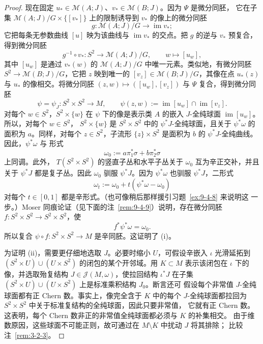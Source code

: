 \begin{proof}
现在固定 $u_*\in\mathcal M(A;J)$、$v_*\in\mathcal M(B;J)$。因为 $\Psi$ 是微分同胚，
它在子集
$\mathcal M(A;J)/G\times\{[v_*]\}$ 上的限制诱导到 $v_*$ 的像上的微分同胚
\[
  g:\mathcal M(A;J)/G\longrightarrow\operatorname{im}v_*;
\]
它把每条无参数曲线 $[u]$ 映为该曲线与 $\operatorname{im}v_*$ 的交点。把 $g$ 的逆与
$v_*$ 预复合，得到微分同胚
\[
  g^{-1}\circ v_*:S^2\longrightarrow\mathcal M(A;J)/G,
  \qquad
  w\longmapsto[u_w],
\]
其中 $[u_w]$ 是通过 $v_*(w)$ 的 $\mathcal M(A;J)/G$ 中唯一元素。类似地，有微分同胚
$S^2\to\mathcal M(B;J)/G$，它把 $z$ 映到唯一的
$[v_z]\in\mathcal M(B;J)/G$，其像在点 $u_*(z)$ 与 $u_*$ 的像相交。将微分同胚
$(z,w)\mapsto([u_w],[v_z])$ 与 $\Psi$ 复合，得到微分同胚
\begin{equation}\label{eq:9-4-4}
  \psi=\psi_J:S^2\times S^2\longrightarrow M,
  \qquad
  \psi(z,w):=\operatorname{im}[u_w]\cap\operatorname{im}[v_z].
\end{equation}
对每个 $w\in S^2$，$S^2\times\{w\}$ 在 $\psi$ 下的像是表示类 $A$ 的嵌入
$J$-全纯球面 $\operatorname{im}[u_w]$。所以，对每个 $w\in S^2$，
$S^2\times\{w\}$ 是 $S^2\times S^2$ 中的 $\psi^*J$-全纯球面，且关于
$\psi^*\omega$ 的面积为 $a$。同样，对每个 $z\in S^2$，子流形
$\{z\}\times S^2$ 是面积为 $b$ 的 $\psi^*J$-全纯曲线。因此，$\psi^*\omega$ 与
形式
\[
  \omega_0:=a\pi_1^*\sigma+b\pi_2^*\sigma
\]
上同调。此外，
$T(S^2\times S^2)$ 的竖直子丛和水平子丛关于 $\omega_0$ 互为辛正交补，并且关于
$\psi^*J$ 都是复子丛。因此 $\omega_0$ 驯服 $\psi^*J$。因为 $\psi^*\omega$ 也驯服
$\psi^*J$，二形式
\[
  \omega_t:=\omega_0+t(\psi^*\omega-\omega_0)
\]
对每个 $t\in[0,1]$ 都是辛形式。（也可像稍后那样援引习题~\ref{ex:9-4-8} 来说明这
一步。）Moser 同痕论证（见下面的注~\ref{rem:9-4-9}）说明，存在微分同胚
$f:S^2\times S^2\to S^2\times S^2$，使
\[
  f^*\psi^*\omega=\omega_0.
\]
所以复合 $\psi\circ f:S^2\times S^2\to M$ 是辛同胚。这证明了 (i)。

为证明 (ii)，需要更仔细地选取 $J$。必要时缩小 $U$，可假设辛嵌入 $\iota$ 光滑延拓到
$(S^2\times U)\cup(U\times S^2)$ 的闭包的某个开邻域。用 $K\subset M$ 表示该闭包在
$\iota$ 下的像，并选取殆复结构 $J\in\mathcal J(M,\omega)$，使拉回结构
$\iota^*J$ 在子集 $(S^2\times U)\cup(U\times S^2)$ 上是标准乘积结构 $J_0$。断言还可
假设每个非常值 $J$-全纯球面都有正 Chern 数。事实上，像完全含于 $K$ 中的每个
$J$-全纯球面都拉回为 $S^2\times S^2$ 中关于标准复结构的全纯球面，因此只要非常值，
它就有正 Chern 数。这表明，每个 Chern 数非正的非常值全纯球面都必须与 $K$ 的补集相交。
由于维数原因，这些球面不可能正则，故可通过在 $M\setminus K$ 中扰动 $J$ 将其排除；
比较注~\ref{rem:3-2-3}。


\end{proof}
